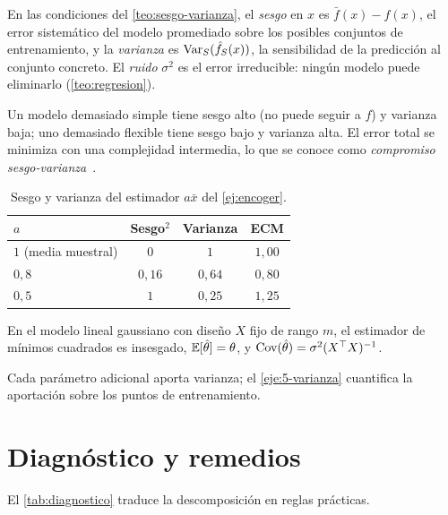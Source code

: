 \begin{definicion}
En las condiciones del \cref{teo:sesgo-varianza}, el \emph{sesgo} en $x$ es $\bar f(x)-f(x)$, el error sistemático del modelo promediado sobre los posibles conjuntos de entrenamiento, y la \emph{varianza} es $\operatorname{Var}_S(\hat f_S(x))$, la sensibilidad de la predicción al conjunto concreto. El \emph{ruido} $\sigma^{2}$ es el error irreducible: ningún modelo puede eliminarlo (\cref{teo:regresion}).
\end{definicion}

Un modelo demasiado simple tiene sesgo alto (no puede seguir a $f$) y varianza baja; uno demasiado flexible tiene sesgo bajo y varianza alta. El error total se minimiza con una complejidad intermedia, lo que se conoce como \emph{compromiso sesgo-varianza}~\cite[§2.9]{esl}.

\addtocounter{definicion}{1}%

\begin{table}[h]
\centering\small
\caption{Sesgo y varianza del estimador $a\bar x$ del \cref{ej:encoger}.}\label{tab:encoger}
\begin{tabular}{@{}lccc@{}}
\toprule
$a$ & Sesgo$^{2}$ & Varianza & ECM \\
\midrule
$1$ (media muestral) & $0$ & $1$ & $1{,}00$ \\
$0{,}8$ & $0{,}16$ & $0{,}64$ & $0{,}80$ \\
$0{,}5$ & $1$ & $0{,}25$ & $1{,}25$ \\
\bottomrule
\end{tabular}
\end{table}

\begin{proposicion}\label{prop:var-mc}
En el modelo lineal gaussiano con diseño $X$ fijo de rango $m$, el estimador de mínimos cuadrados es insesgado, $\mathbb{E}[\hat\theta]=\theta$, y $\operatorname{Cov}(\hat\theta)=\sigma^{2}(X^{\top}X)^{-1}$.
\end{proposicion}

Cada parámetro adicional aporta varianza; el \cref{eje:5-varianza} cuantifica la aportación sobre los puntos de entrenamiento.

\section{Diagnóstico y remedios}

El \cref{tab:diagnostico} traduce la descomposición en reglas prácticas.


